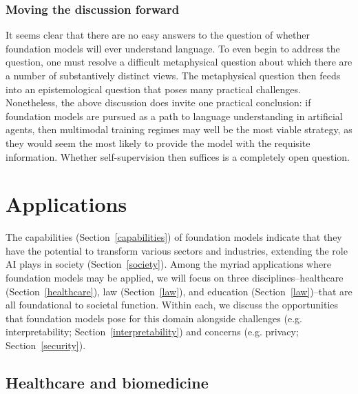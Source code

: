 \subsubsection{Moving the discussion forward}

It seems clear that there are no easy answers to the question of whether foundation models will ever understand language. To even begin to address the question, one must resolve a difficult metaphysical question about which there are a number of substantively distinct views. The metaphysical question then feeds into an epistemological question that poses many practical challenges. Nonetheless, the above discussion does invite one practical conclusion: if foundation models are pursued as a path to language understanding in artificial agents, then multimodal training regimes may well be the most viable strategy, as they would seem the most likely to provide the model with the requisite information. Whether self-supervision then suffices is a completely open question.

\section{Applications}
\label{sec:applications}

The capabilities (Section~\ref{capabilities}) of foundation models indicate that they have the potential to transform various sectors and industries, extending the role AI plays in society (Section~\ref{society}). 
Among the myriad applications where foundation models may be applied, we will focus on three disciplines--healthcare (Section~\ref{healthcare}), law (Section~\ref{law}), and education (Section~\ref{law})--that are all foundational to societal function. Within each, we discuss the opportunities that foundation models pose for this domain alongside challenges (e.g. interpretability; Section~\ref{interpretability}) and concerns (e.g. privacy; Section~\ref{security}).


\newsection
\subsection{Healthcare and biomedicine}
\label{sec:healthcare}

